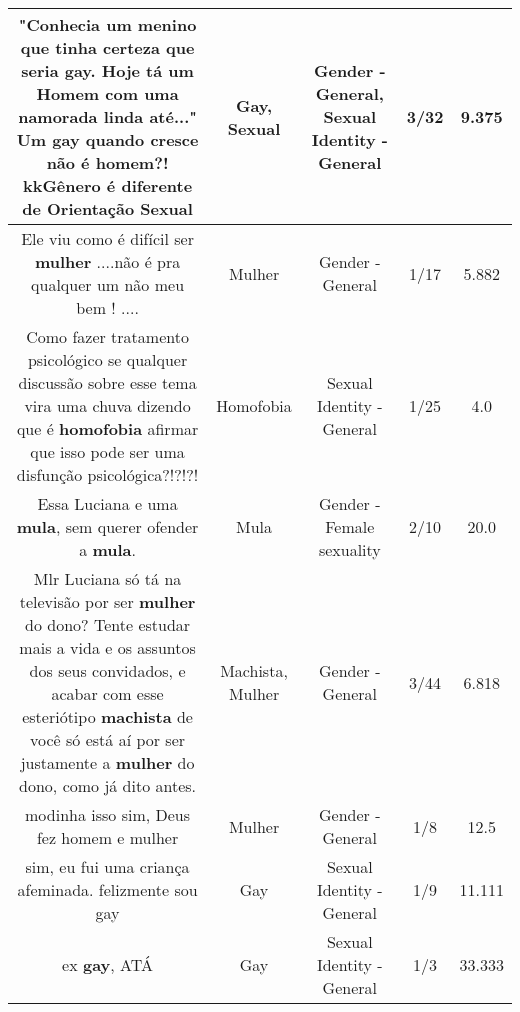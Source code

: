 \documentclass[11pt]{article}
\newlength\mylength
\begin{document}
\begin{center}
\begin{longtable}{|C{.65\mylength}|C{.30\mylength}|C{.12\mylength}|C{.12\mylength}|C{.12\mylength}|}
  \small "Conhecia um menino que tinha certeza que seria \textbf{gay}. Hoje tá um Homem com uma namorada linda até..." Um \textbf{gay} quando cresce não é homem?! kkGênero é diferente de Orientação Sexual\normalsize   & Gay, Sexual & Gender - General, Sexual Identity - General & 3/32 & 9.375 \\  \hline
  \small Ele viu como é  difícil ser \textbf{mulher} ....não é pra qualquer um não meu bem ! ....\normalsize   & Mulher & Gender - General & 1/17 & 5.882 \\  \hline
  \small Como fazer tratamento psicológico se qualquer discussão sobre esse tema vira uma chuva dizendo que é \textbf{homofobia} afirmar que isso pode ser uma disfunção psicológica?!?!?!\normalsize   & Homofobia & Sexual Identity - General & 1/25 & 4.0 \\  \hline
  \small Essa Luciana e uma \textbf{mula}, sem querer ofender a \textbf{mula}.\normalsize   & Mula & Gender - Female sexuality & 2/10 & 20.0 \\  \hline
  \small Mlr Luciana só tá na televisão por ser \textbf{mulher} do dono? Tente estudar mais a vida e os assuntos dos seus convidados, e acabar com esse esteriótipo \textbf{machista} de você só está aí por ser justamente a \textbf{mulher} do dono, como já dito antes.\normalsize   & Machista, Mulher & Gender - General & 3/44 & 6.818 \\  \hline
  \small modinha isso sim, Deus fez homem e mulher\normalsize   & Mulher & Gender - General & 1/8 & 12.5 \\  \hline
  \small sim, eu fui uma criança afeminada. felizmente sou gay\normalsize   & Gay & Sexual Identity - General & 1/9 & 11.111 \\  \hline
  \small ex \textbf{gay}, ATÁ\normalsize   & Gay & Sexual Identity - General & 1/3 & 33.333 \\  \hline

\end{longtable}
\end{center}
\end{document}
